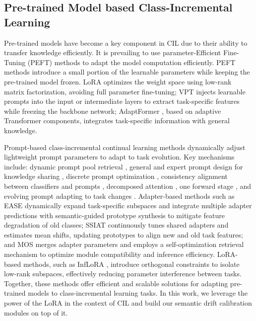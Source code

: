 
\subsection{Pre-trained Model based Class-Incremental Learning}
Pre-trained models have become a key component in CIL due to their ability to transfer knowledge efficiently. It is prevailing to use parameter-Efficient Fine-Tuning (PEFT) methods to adapt the model computation efficiently. PEFT methods introduce a small portion of the learnable parameters while keeping the pre-trained model frozen. LoRA \cite{hu2022lora} optimizes the weight space using low-rank matrix factorization, avoiding full parameter fine-tuning; VPT \cite{jia2022visual} injects learnable prompts into the input or intermediate layers to extract task-specific features while freezing the backbone network; AdaptFormer \cite{chen2022adaptformer}, based on adaptive Transformer components, integrates task-specific information with general knowledge. 

Prompt-based class-incremental continual learning methods dynamically adjust lightweight prompt parameters to adapt to task evolution. Key mechanisms include: dynamic prompt pool retrieval \cite{wang2022learning}, general and expert prompt design for knowledge sharing \cite{wang2022dualprompt}, discrete prompt optimization \cite{jiao2024vector}, consistency alignment between classifiers and prompts \cite{gao2024consistent}, decomposed attention \cite{smith2023coda}, one forward stage \cite{kim2024one}, and evolving prompt adapting to task changes \cite{kurniawan2024evoprompt}.  Adapter-based methods such as EASE \cite{zhou2024expandable} dynamically expand task-specific subspaces and integrate multiple adapter predictions with semantic-guided prototype synthesis to mitigate feature degradation of old classes; SSIAT \cite{tan2024semantically} continuously tunes shared adapters and estimates mean shifts, updating prototypes to align new and old task features; and MOS \cite{sun2024mos} merges adapter parameters and employs a self-optimization retrieval mechanism to optimize module compatibility and inference efficiency.  LoRA-based methods, such as InfLoRA \cite{liang2024inflora}, introduce orthogonal constraints to isolate low-rank subspaces, effectively reducing parameter interference between tasks. Together, these methods offer efficient and scalable solutions for adapting pre-trained models to class-incremental learning tasks. In this work, we leverage the power of the LoRA in the context of CIL and build our semantic drift calibration modules on top of it.